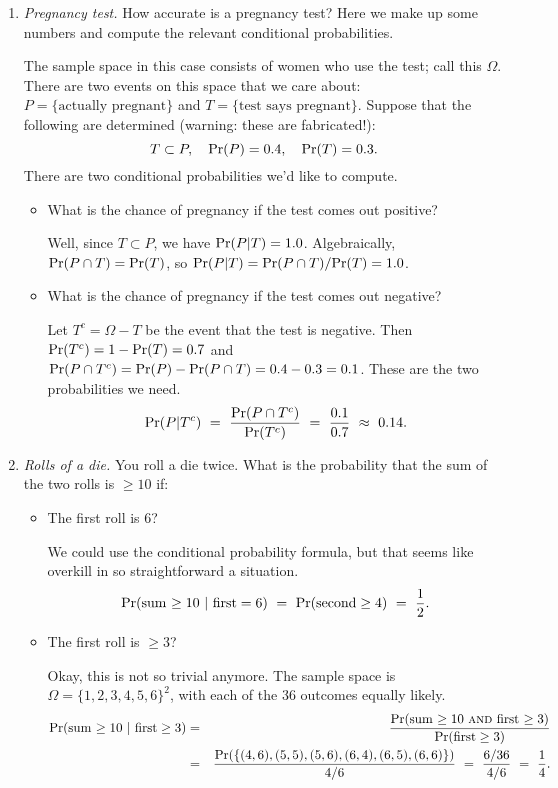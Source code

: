 \documentclass{report}
\theoremstyle{plain}
\theoremstyle{definition}
\newcommand{\pr}{\mbox{\rm Pr}}
\begin{document}
\begin{enumerate}

\item {\it Pregnancy test.} How accurate is a pregnancy test? Here we make up some numbers and compute the relevant conditional probabilities.

The sample space in this case consists of women who use the test; call this $\Omega$. There are two events on this space that we care about: $P = \{\mbox{actually pregnant}\}$ and $T = \{\mbox{test says pregnant}\}$. Suppose that the following are determined (warning: these are fabricated!):
$$ T \subset P, \ \ \ \pr(P) = 0.4, \ \ \ \pr(T) = 0.3 .$$
There are two conditional probabilities we'd like to compute.
\begin{itemize}
\item What is the chance of pregnancy if the test comes out positive?

Well, since $T \subset P$, we have $\pr(P|T) = 1.0$. Algebraically, $\pr(P \cap T) = \pr(T)$, so $\pr(P|T) = \pr(P \cap T)/\pr(T) = 1.0$.

\item What is the chance of pregnancy if the test comes out negative?

Let $T^c = \Omega - T$ be the event that the test is negative. Then $\pr(T^c) = 1 - \pr(T) = 0.7$ and $\pr(P \cap T^c) = \pr(P) - \pr(P \cap T) = 0.4 - 0.3 = 0.1$. These are the two probabilities we need.
$$ \pr(P | T^c)  \ = \ \frac{\pr(P \cap T^c)}{\pr(T^c)} \ = \ \frac{0.1}{0.7} \ \approx \ 0.14 .$$
\end{itemize}

\item {\it Rolls of a die.} You roll a die twice. What is the probability that the sum of the two rolls is $\geq 10$ if:
\begin{itemize}
\item The first roll is 6?

We could use the conditional probability formula, but that seems like overkill in so straightforward a situation.
$$ \pr(\mbox{sum $\geq 10$} \ | \ \mbox{first} = 6) 
\ = \ \pr(\mbox{second} \geq 4) \ = \ \frac{1}{2} .
$$

\item The first roll is $\geq 3$?

Okay, this is not so trivial anymore. The sample space is $\Omega = \{1,2,3,4,5,6\}^2$, with each of the 36 outcomes equally likely.
\begin{eqnarray*}
\pr(\mbox{sum $\geq 10$} \ | \ \mbox{first} \geq 3) 
& = & 
\frac{\pr(\mbox{sum $\geq 10$ {\sc and} first $\geq 3$})}{\pr(\mbox{first} \geq 3)} \\
& = &
\frac{\pr(\{(4,6), (5,5), (5,6), (6,4), (6,5), (6,6)\})}{4/6}
\ = \ 
\frac{6/36}{4/6} \ = \ \frac{1}{4} .
\end{eqnarray*}


\end{itemize}
\end{enumerate}
\end{document}
